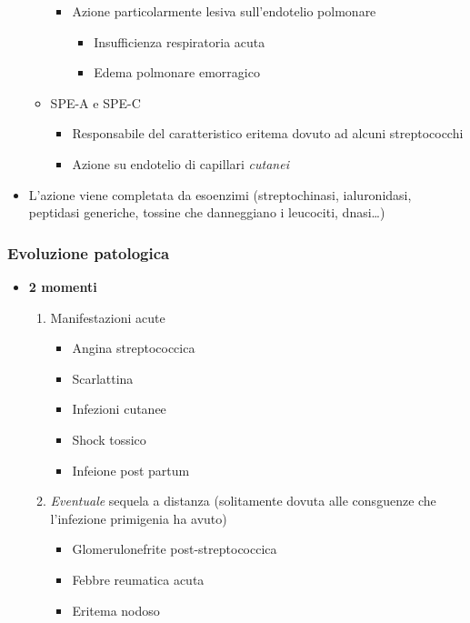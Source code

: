 \documentclass[italian,]{article}
\providecommand{\tightlist}{%
  \setlength{\itemsep}{0pt}\setlength{\parskip}{0pt}}
\begin{document}
\begin{itemize}
\begin{itemize}
    \begin{itemize}
    \tightlist
    \item
      Azione particolarmente lesiva sull'endotelio polmonare

      \begin{itemize}
      \tightlist
      \item
        Insufficienza respiratoria acuta
      \item
        Edema polmonare emorragico
      \end{itemize}
    \end{itemize}
  \item
    SPE-A e SPE-C

    \begin{itemize}
    \tightlist
    \item
      Responsabile del caratteristico eritema dovuto ad alcuni
      streptococchi
    \item
      Azione su endotelio di capillari \emph{cutanei}
    \end{itemize}
  \end{itemize}
\item
  L'azione viene completata da esoenzimi (streptochinasi, ialuronidasi,
  peptidasi generiche, tossine che danneggiano i leucociti,
  dnasi\ldots{})
\end{itemize}

\hypertarget{evoluzione-patologica}{%
\subsubsection{Evoluzione patologica}\label{evoluzione-patologica}}

\begin{itemize}
\tightlist
\item
  \textbf{2 momenti}

  \begin{enumerate}
  \def\labelenumi{\arabic{enumi}.}
  \tightlist
  \item
    Manifestazioni acute

    \begin{itemize}
    \tightlist
    \item
      Angina streptococcica
    \item
      Scarlattina
    \item
      Infezioni cutanee
    \item
      Shock tossico
    \item
      Infeione post partum
    \end{itemize}
  \item
    \emph{Eventuale} sequela a distanza (solitamente dovuta alle
    consguenze che l'infezione primigenia ha avuto)

    \begin{itemize}
    \item
      Glomerulonefrite post-streptococcica
    \item
      Febbre reumatica acuta
    \item
      Eritema nodoso
    \end{itemize}
  \end{enumerate}
\end{itemize}
\end{document}
